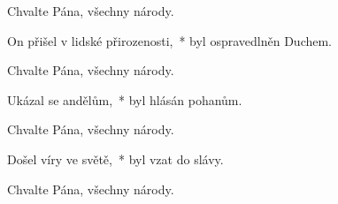 
 Chvalte Pána, všechny národy.

On přišel v lidské přirozenosti,~*
byl ospravedlněn Duchem.

 Chvalte Pána, všechny národy.

Ukázal se andělům,~*
byl hlásán pohanům.

 Chvalte Pána, všechny národy.

Došel víry ve světě,~*
byl vzat do slávy.

 Chvalte Pána, všechny národy. 